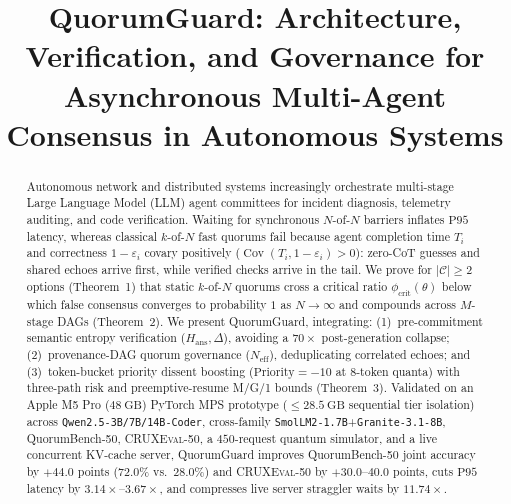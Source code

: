 \documentclass[conference]{IEEEtran}
\def\QG{QuorumGuard}%
\def\QBench{QuorumBench-50}%
\theoremstyle{definition}
\theoremstyle{remark}
\newcommand{\QG}{\textsc{QuorumGuard}}
\newcommand{\QBench}{\textsc{QuorumBench-50}}
\newcommand{\Neff}{N_{\mathrm{eff}}}
\newcommand{\Hans}{H_{\mathrm{ans}}}
\newcommand{\phicrit}{\phi_{\mathrm{crit}}}
\newcommand{\Cov}{\operatorname{Cov}}
\begin{document}
\title{QuorumGuard: Architecture, Verification, and Governance for Asynchronous Multi-Agent Consensus in Autonomous Systems}

\author{
}

\maketitle

\begin{abstract}
Autonomous network and distributed systems increasingly orchestrate multi-stage Large Language Model (LLM) agent committees for incident diagnosis, telemetry auditing, and code verification. Waiting for synchronous $N$-of-$N$ barriers inflates $\mathrm{P95}$ latency, whereas classical $k$-of-$N$ fast quorums fail because agent completion time $T_i$ and correctness $1 - \varepsilon_i$ covary positively ($\Cov(T_i, 1 - \varepsilon_i) > 0$): zero-CoT guesses and shared echoes arrive first, while verified checks arrive in the tail. We prove for $|\mathcal{C}| \ge 2$ options (Theorem~1) that static $k$-of-$N$ quorums cross a critical ratio $\phicrit(\theta)$ below which false consensus converges to probability $1$ as $N \to \infty$ and compounds across $M$-stage DAGs (Theorem~2). We present \QG{}, integrating: (1)~pre-commitment semantic entropy verification ($\Hans, \Delta$), avoiding a $70\times$ post-generation collapse; (2)~provenance-DAG quorum governance ($\Neff$), deduplicating correlated echoes; and (3)~token-bucket priority dissent boosting ($\mathrm{Priority} = -10$ at 8-token quanta) with three-path risk and preemptive-resume M/G/1 bounds (Theorem~3). Validated on an Apple M5 Pro ($48~\mathrm{GB}$) PyTorch MPS prototype ($\le 28.5~\mathrm{GB}$ sequential tier isolation) across \texttt{Qwen2.5-3B/7B/14B-Coder}, cross-family \texttt{SmolLM2-1.7B}+\texttt{Granite-3.1-8B}, \QBench{}, \textsc{CRUXEval-50}, a $450$-request quantum simulator, and a live concurrent KV-cache server, \QG{} improves \QBench{} joint accuracy by $+44.0$ points ($72.0\%$ vs.\ $28.0\%$) and \textsc{CRUXEval-50} by $+30.0$--$40.0$ points, cuts $\mathrm{P95}$ latency by $3.14\times$--$3.67\times$, and compresses live server straggler waits by $11.74\times$.
\end{abstract}
\end{document}
